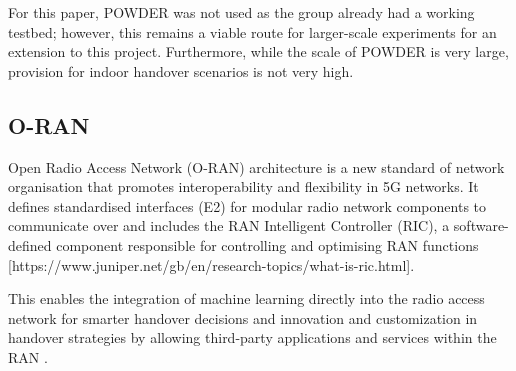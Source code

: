 For this paper, POWDER was not used as the group already had a working testbed; however, this remains a viable route for larger-scale experiments for an extension to this project. Furthermore, while the scale of POWDER is very large, provision for indoor handover scenarios is not very high.

\subsection{O-RAN}
Open Radio Access Network (O-RAN) architecture is a new standard of network organisation that promotes interoperability and flexibility in 5G networks. It defines standardised interfaces (E2) for modular radio network components to communicate over and includes the RAN Intelligent Controller (RIC), a software-defined component responsible for controlling and optimising RAN functions [https://www.juniper.net/gb/en/research-topics/what-is-ric.html]. 

This enables the integration of machine learning directly into the radio access network for smarter handover decisions and innovation and customization in handover strategies by allowing third-party applications and services within the RAN  \cite{Niknam2020IntelligentORAN}. 







